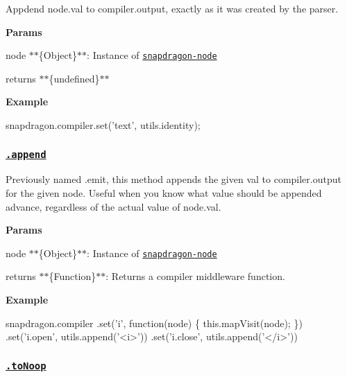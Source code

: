 Appdend {\ttfamily node.\+val} to {\ttfamily compiler.\+output}, exactly as it was created by the parser.

{\bfseries Params}


\begin{DoxyItemize}
\item {\ttfamily node} $\ast$$\ast$\{Object\}$\ast$$\ast$\+: Instance of \href{https://github.com/jonschlinkert/snapdragon-node}{\tt snapdragon-\/node}
\item {\ttfamily returns} $\ast$$\ast$\{undefined\}$\ast$$\ast$
\end{DoxyItemize}

{\bfseries Example}


\begin{DoxyCode}
snapdragon.compiler.set('text', utils.identity);
\end{DoxyCode}


\subsubsection*{\href{index.js#L76}{\tt .append}}

Previously named {\ttfamily .emit}, this method appends the given {\ttfamily val} to {\ttfamily compiler.\+output} for the given node. Useful when you know what value should be appended advance, regardless of the actual value of {\ttfamily node.\+val}.

{\bfseries Params}


\begin{DoxyItemize}
\item {\ttfamily node} $\ast$$\ast$\{Object\}$\ast$$\ast$\+: Instance of \href{https://github.com/jonschlinkert/snapdragon-node}{\tt snapdragon-\/node}
\item {\ttfamily returns} $\ast$$\ast$\{Function\}$\ast$$\ast$\+: Returns a compiler middleware function.
\end{DoxyItemize}

{\bfseries Example}


\begin{DoxyCode}
snapdragon.compiler
  .set('i', function(node) \{
    this.mapVisit(node);
  \})
  .set('i.open', utils.append('<i>'))
  .set('i.close', utils.append('</i>'))
\end{DoxyCode}


\subsubsection*{\href{index.js#L99}{\tt .to\+Noop}}

